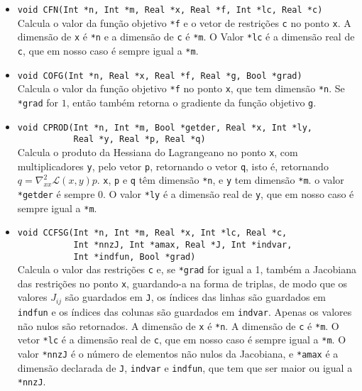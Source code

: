 \begin{itemize}
  \item \verb+void CFN(Int *n, Int *m, Real *x, Real *f, Int *lc, Real *c)+ \\
    Calcula o valor da função objetivo \verb+*f+ e o vetor de restrições
    \verb+c+ no ponto \verb+x+. A dimensão de \verb+x+ é \verb+*n+ e a dimensão
    de \verb+c+ é \verb+*m+. O Valor \verb+*lc+ é a dimensão real de \verb+c+,
    que em nosso caso é sempre igual a \verb+*m+.
  \item \verb+void COFG(Int *n, Real *x, Real *f, Real *g, Bool *grad)+ \\
    Calcula o valor da função objetivo \verb+*f+ no ponto \verb+x+, que tem
    dimensão \verb+*n+. Se \verb+*grad+ for $1$, então também retorna o
    gradiente da função objetivo \verb+g+.
  \item 
    \verb+void CPROD(Int *n, Int *m, Bool *getder, Real *x, Int *ly,+ \\
    \verb+           Real *y, Real *p, Real *q)+ \\
    Calcula o produto da Hessiana do Lagrangeano no ponto \verb+x+, com
    multiplicadores \verb+y+, pelo vetor \verb+p+, retornando o vetor \verb+q+,
    isto é, retornando $q = \nabla_{xx}^2\mathcal{L}(x,y)p$. \verb+x+, \verb+p+
    e \verb+q+ têm dimensão \verb+*n+, e \verb+y+ tem dimensão \verb+*m+.  o
    valor \verb+*getder+ é sempre $0$. O valor \verb+*ly+ é a dimensão real de
    \verb+y+, que em nosso caso é sempre igual a \verb+*m+.
  \item 
    \verb+void CCFSG(Int *n, Int *m, Real *x, Int *lc, Real *c,+\\
    \verb+           Int *nnzJ, Int *amax, Real *J, Int *indvar,+\\
    \verb+           Int *indfun, Bool *grad)+\\
    Calcula o valor das restrições \verb+c+ e, se \verb+*grad+ for igual a 1,
    também a Jacobiana das restrições no ponto \verb+x+, guardando-a na forma de
    triplas, de modo que os valores $J_{ij}$ são guardados em \verb+J+, os índices
    das linhas são guardados em \verb+indfun+ e os índices das colunas são
    guardados em \verb+indvar+. Apenas os valores não nulos são retornados. 
    A dimensão de \verb+x+ é \verb+*n+. A dimensão de \verb+c+ é \verb+*m+.
    O vetor \verb+*lc+ é a dimensão real de \verb+c+, que em nosso caso é sempre
    igual a \verb+*m+. O valor \verb+*nnzJ+ é o número de elementos não nulos da
    Jacobiana, e \verb+*amax+ é a dimensão declarada de \verb+J+, \verb+indvar+
    e \verb+indfun+, que tem que ser maior ou igual a \verb+*nnzJ+.
\end{itemize}
